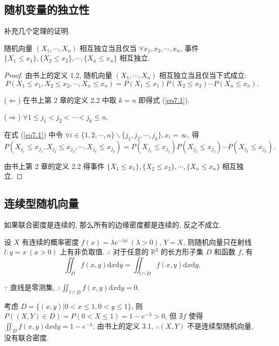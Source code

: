 \documentclass[color=black,device=normal,lang=cn]{elegantnote}
\numberwithin{equation}{section}
\theoremstyle{plain}
\numberwithin{exercise}{exsection}
\begin{document}
\subsection{随机变量的独立性}
补充几个定理的证明.
\begin{theorem}
    随机向量 $(X_1,\cdots,X_n)$ 相互独立当且仅当 $\forall x_1,x_2,\cdots,x_n$, 事件 $\{X_1\leq x_1\},\{X_2\leq x_2\},\cdots,\{X_n\leq x_n\}$ 相互独立.
\end{theorem}
\begin{proof}
    由书上的定义 1.2, 随机向量 $(X_1,\cdots,X_n)$ 相互独立当且仅当下式成立:
    \begin{equation}\label{eq7.1}
        P(X_1\leq x_1,X_2\leq x_2,\cdots,X_n\leq x_n)=P(X_1\leq x_1)P(X_2\leq x_2)\cdots P(X_n\leq x_n).
    \end{equation}

    ($\Leftarrow$) 在书上第 2 章的定义 2.2 中取 $k=n$ 即得式 (\ref{eq7.1}).

    ($\Rightarrow$) $\forall 1\leq j_1<j_2<\cdots<j_k\leq n$.
    
    在式 (\ref{eq7.1}) 中令 $\forall i\in\{1,2,\cdots,n\}\backslash\{j_1,j_2,\cdots,j_k\},x_i=\infty$, 得
    \[P(X_{j_1}\leq x_{j_1},X_{j_2}\leq x_{j_2},\cdots,X_{j_k}\leq x_{j_k})=P(X_{j_1}\leq x_{j_1})P(X_{j_2}\leq x_{j_2})\cdots P(X_{j_k}\leq x_{j_k}).\]

    由书上第 2 章的定义 2.2 得事件 $\{X_1\leq x_1\},\{X_2\leq x_2\},\cdots,\{X_n\leq x_n\}$ 相互独立.
\end{proof}
\subsection{连续型随机向量}
如果联合密度是连续的, 那么所有的边缘密度都是连续的, 反之不成立.
\begin{example}
    设 $X$ 有连续的概率密度 $f(x)=\lambda e^{-\lambda x}\ (\lambda>0)$, $Y=X$, 则随机向量只在射线 $l:y=x\ (x>0)$ 上有非负取值. $\therefore$ 对于任意的 $\mathbb{R}^2$ 的长方形子集 $D$ 和函数 $f$, 有
    \[\iint_Df(x,y)\mathrm{d}x\mathrm{d}y=\iint_{l\cap D}f(x,y)\mathrm{d}x\mathrm{d}y.\]

    $\because$ 直线是零测集, $\therefore\iint_{l\cap D}f(x,y)\mathrm{d}x\mathrm{d}y=0$.

    考虑 $D=\{(x,y)|0<x\leq 1,0<y\leq 1\}$, 则 $P((X,Y)\in D)=P(0<X\leq 1)=1-e^{-\lambda}>0$, 但 $\nexists f$ 使得 $\iint_Df(x,y)\mathrm{d}x\mathrm{d}y=1-e^{-\lambda}$. 由书上的定义 3.1, $\therefore(X,Y)$ 不是连续型随机向量, 没有联合密度.
\end{example}
\end{document}
